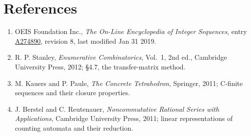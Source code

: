 \documentclass[11pt]{article}
\theoremstyle{definition}
\begin{document}
\section{References}

\begin{enumerate}

\item OEIS Foundation Inc., \emph{The On-Line Encyclopedia of Integer Sequences}, entry \href{https://oeis.org/A274890}{A274890}, revision 8, last modified Jan 31 2019.

\item R. P. Stanley, \emph{Enumerative Combinatorics}, Vol.~1, 2nd ed., Cambridge University Press, 2012; \S4.7, the transfer-matrix method.

\item M. Kauers and P. Paule, \emph{The Concrete Tetrahedron}, Springer, 2011; C-finite sequences and their closure properties.

\item J. Berstel and C. Reutenauer, \emph{Noncommutative Rational Series with Applications}, Cambridge University Press, 2011; linear representations of counting automata and their reduction.

\end{enumerate}
\end{document}
